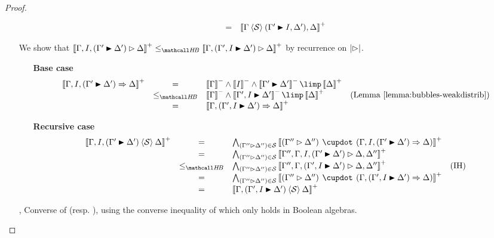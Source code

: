 \begin{proof}
\begin{itemize}
\begin{itemize}
$$\begin{array}{rcll}
        &=& \psint{\Gamma \piq{\cS} (\Gamma' \JB I, \Delta'), \Delta} & \\
      \end{array}
      $$
    \end{itemize}
    \item[{\rnmsf{f{-}{-}{\uparrow}}}]
    We show that $\psint{\Gamma, I, (\Gamma' \JB \Delta') \J \Delta} \sementHB
    \psint{\Gamma, (\Gamma', I \JB \Delta') \J \Delta}$ by recurrence on
    $\left|\mathbin{\rhd}\right|$.
    \begin{itemize}
      \item[\textbf{Base case}]
      $$
      \begin{array}{rcll}
        \psint{\Gamma, I, (\Gamma' \JB \Delta') \seq \Delta}
        &=& \nsint{\Gamma} \land \nsint{I} \land \nsint{\Gamma' \JB \Delta'} \limp \psint{\Delta} & \\
        &\sementHB& \nsint{\Gamma} \land \nsint{\Gamma', I \JB \Delta'} \limp \psint{\Delta} &\text{(\reflemma{bubbles-weakdistrib})} \\
        &=& \psint{\Gamma, (\Gamma', I \JB \Delta') \seq \Delta} & \\
      \end{array}
      $$
      \item[\textbf{Recursive case}]
      $$
      \begin{array}{rcll}
        \psint{\Gamma, I, (\Gamma' \JB \Delta') \piq{\cS} \Delta}
        &=& \psintAndMix{(\Gamma'' \J \Delta'')}{\cS}{\Gamma, I, (\Gamma' \JB \Delta')}{\Delta} & \\
        &=& \psintAnd{(\Gamma'' \J \Delta'')}{\cS}{\Gamma'', \Gamma, I, (\Gamma' \JB \Delta') \J \Delta, \Delta''} & \\
        &\sementHB& \psintAnd{(\Gamma'' \J \Delta'')}{\cS}{\Gamma'', \Gamma, (\Gamma', I \JB \Delta') \J \Delta, \Delta''} &\text{(IH)} \\
        &=& \psintAndMix{(\Gamma'' \J \Delta'')}{\cS}{\Gamma, (\Gamma', I \JB \Delta')}{\Delta} & \\
        &=& \psint{\Gamma, (\Gamma', I \JB \Delta') \piq{\cS} \Delta} & \\
      \end{array}
      $$
    \end{itemize}

    \item[{\rnmsf{f{-}{+}{\uparrow}}}, {\rnmsf{f{+}{-}{\uparrow}}}] Converse of
    {} (resp. {}), using
    the converse inequality of  which only holds in
    Boolean algebras.


\end{itemize}
\end{proof}
